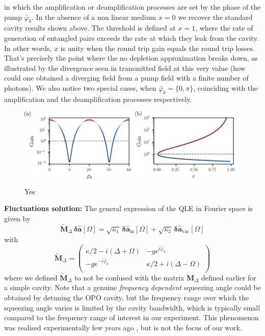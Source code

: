 in which the amplification or deamplification processes are set by the phase of the pump $\bar{\varphi}_b$. In the absence of a non linear medium $x=0$ we recover the standard cavity results shown above. The threshold is defined at $x=1$, where the rate of generation of entangled pairs exceeds the rate at which they leak from the cavity. In other words, $x$ is unity when the round trip gain equals the round trip losses. That's precisely the point where the no depletion approximation breaks down, as illustrated by the divergence seen in transmitted field at this very value (how could one obtained a diverging field from a pump field with a finite number of photons). We also notice two special cases, when $\bar\varphi_b=\{0,\pi\}$, coinciding with the amplification and the deamplification processes respectively. \\

\begin{figure}[h!]
\centering
\includegraphics[width=\textwidth]{./chap2/fig/amp_deamp.pdf}
\caption{Yes} 
\end{figure}

\noindent \textbf{Fluctuations solution: } The general expression of the QLE in Fourier space is given by 
\begin{equation}
  \tilde{\mathbf{M}}_\Delta \,  \mathbf{\delta \hat{a}}[\Omega]  = \sqrt{\kappa_{\mathrm{1}}} \, \mathbf{\delta \hat{a}_{\mathrm{in}}}[\Omega]  + \sqrt{\kappa_2} \, \mathbf{\delta \hat{a}_{\mathrm{vac}}}[\Omega]
\end{equation}
with
\begin{equation*}
  \tilde{\mathbf{M}}_\Delta = \begin{pmatrix}
  \kappa/2-i(\Delta+\Omega) & -g e^{i\bar{\varphi}_b}\\
   -g e^{-i\bar{\varphi}_b} & \kappa/2+i(\Delta-\Omega) \\
  \end{pmatrix}
\end{equation*}
where we defined $\tilde{\mathbf{M}}_\Delta$ to not be confused with the matrix $\mathbf{M}_\Delta$ defined earlier for a simple cavity.
Note that a genuine \textit{frequency dependent} squeezing angle could be obtained by detuning the OPO cavity, but the frequency range over which the squeezing angle varies is limited by the cavity bandwidth, which is typically small compared to the frequency range of interest in our experiment. This phenomenon was realised experimentally few years ago \cite{Vahlbruch2006}, but is not the focus of our work. \\

